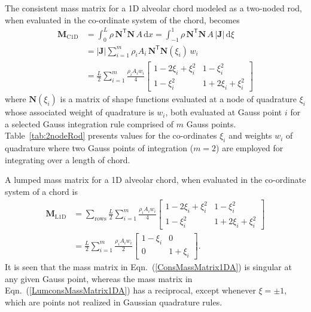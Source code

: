 The consistent mass matrix for a 1D alveolar chord modeled as a two-noded rod, when evaluated in the co-ordinate system of the chord, becomes
\begin{equation} 
\begin{aligned}
\mathbf{M}_{\mathrm{C1D}} & = \int_0^L \rho \, \mathbf{N}^{\mathsf{T}} \mathbf{N} \, A \, \mathrm{d} x  = \int_{-1}^{1} \rho \, \mathbf{N}^{\mathsf{T}} \mathbf{N}\, A \, | \mathbf{J} | \,  \mathrm{d} \xi \\ & 
= | \mathbf{J} | \sum_{i=1}^m  \rho_i A_i  \, \mathbf{N} ^{\mathsf{T}} \mathbf{N}(\xi_i) \, w_i \\ &
= \frac{L}{2} \sum_{i=1}^m \frac{\rho_i A_i w_i}{4} \begin{bmatrix}
1 - 2\xi_i + \xi_i^2 & 1 - \xi_i^2 \\
1 - \xi_i^2 & 1 + 2 \xi_i + \xi_i^2
\end{bmatrix}
\end{aligned}
\label{ConsMassMatrix1DA}
\end{equation}
where $\textbf{N} (\xi_i)$ is a matrix of shape functions evaluated at a node of quadrature $\xi_i$ whose associated weight of quadrature is $w_i$, both evaluated at Gauss point $i$ for a selected Gauss integration rule comprised of $m$ Gauss points.  Table~\ref{tab:2nodeRod} presents values for the co-ordinates $\xi_i$ and weights $w_i$ of quadrature where two Gauss points of integration ($m=2$) are employed for integrating over a length of chord.  

A lumped mass matrix for a 1D alveolar chord, when evaluated in the co-ordinate system of a chord is 
\begin{equation}
    \begin{aligned}
    \mathbf{M}_{\mathrm{L1D}} & = \sum_{\text{rows}} \frac{L}{2} 
    \sum_{i=1}^m \frac{\rho_i A_i w_i}{4} \begin{bmatrix}
    1 - 2\xi_i + \xi_i^2 & 1 - \xi_i^2 \\
    1 - \xi_i^2 & 1 + 2 \xi_i + \xi_i^2
    \end{bmatrix} \\
    & = \frac{L}{2} \sum_{i=1}^m \frac{\rho_i A_i w_i}{2} \begin{bmatrix} 
    1 - \xi_i & 0 \\ 0 & 1 + \xi_i \end{bmatrix} .
    \end{aligned}
    \label{LumconsMassMatrix1DA}
\end{equation}
It is seen that the mass matrix in Eqn.~(\ref{ConsMassMatrix1DA}) is singular at any given Gauss point, whereas the mass matrix in Eqn.~(\ref{LumconsMassMatrix1DA}) has a reciprocal, except whenever $\xi = \pm 1$, which are points not realized in Gaussian quadrature rules. 

